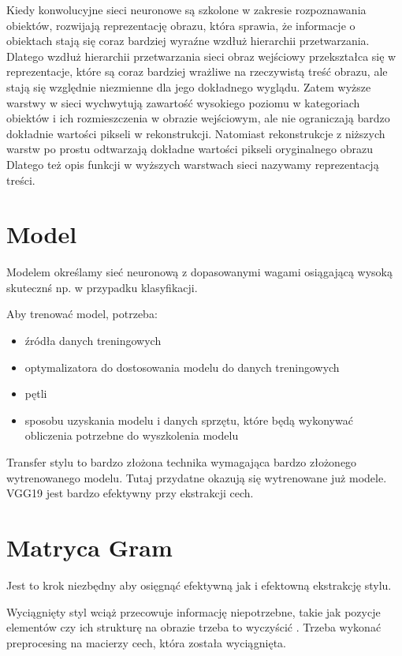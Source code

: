 \documentclass[brudnopis]{xmgr}
\begin{document}
Kiedy konwolucyjne sieci neuronowe są szkolone w zakresie rozpoznawania obiektów, rozwijają reprezentację obrazu, która sprawia, że informacje o obiektach stają się coraz bardziej wyraźne wzdłuż hierarchii przetwarzania. Dlatego wzdłuż hierarchii przetwarzania sieci obraz wejściowy przekształca się w reprezentacje, które są coraz bardziej wrażliwe na rzeczywistą treść obrazu, ale stają się względnie niezmienne dla jego dokładnego wyglądu. Zatem wyższe warstwy w sieci wychwytują zawartość wysokiego poziomu w kategoriach obiektów i ich rozmieszczenia w obrazie wejściowym, ale nie ograniczają bardzo dokładnie wartości pikseli w rekonstrukcji. Natomiast rekonstrukcje z niższych warstw po prostu odtwarzają dokładne wartości pikseli oryginalnego obrazu Dlatego też opis funkcji w wyższych warstwach sieci nazywamy reprezentacją treści.


\section{Model\label{s:dsssl}}
Modelem określamy sieć neuronową z dopasowanymi wagami osiągającą wysoką skutecznś np. w przypadku klasyfikacji.

Aby trenować model, potrzeba:

\begin{itemize}
\item źródła danych treningowych
\item optymalizatora do dostosowania modelu do danych treningowych 
\item pętli  
\item sposobu uzyskania modelu i danych sprzętu, które będą wykonywać obliczenia potrzebne do wyszkolenia modelu

\end{itemize}

Transfer stylu to bardzo złożona technika wymagająca bardzo złożonego wytrenowanego modelu. Tutaj przydatne okazują się wytrenowane już modele. VGG19 jest bardzo efektywny przy ekstrakcji cech.

\section{Matryca Gram\label{s:dsssl}}

Jest to krok niezbędny aby osięgnąć efektywną jak i efektowną ekstrakcję stylu.

Wyciągnięty styl wciąż przecowuje informację niepotrzebne, takie jak pozycje elementów czy ich strukturę na obrazie trzeba to wyczyścić .
Trzeba wykonać preprocesing na macierzy cech, która została wyciągnięta.
\end{document}
